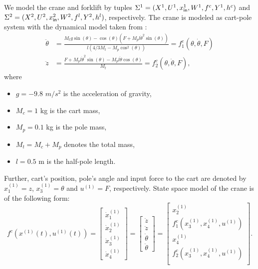 We model the crane and forklift by tuples $\Sigma^1=(X^1,U^1,x_{\mathsf{in}}^1,W^1,f^c,Y^1,h^c)$ and $\Sigma^2=(X^2,U^2,x_{\mathsf{in}}^2,W^2,f^l,Y^2,h^l)$, respectively. The crane is modeled as cart-pole system with the dynamical model taken from \cite{Barto1983}:
\begin{align*}
	\ddot{\theta} &= \frac{M_tg\sin(\theta) - \cos(\theta)(F + M_pl \dot{\theta}^2 \sin(\theta))}{l(4/3 M_t- M_p \cos^2(\theta))}=f^c_1(\theta,\dot{\theta},F)\\
	\ddot{z}&= \frac{F + M_pl \dot{\theta}^2 \sin(\theta)-M_pl \ddot{\theta} \cos(\theta)}{M_t}=f^c_2(\theta,\dot{\theta},F),
\end{align*}
where
\begin{itemize}
	\item[] $g=-9.8$ $m/s^2$ is the acceleration of gravity,
	\item[] $M_c=1$ kg is the cart mass,
	\item[] $M_p=0.1$ kg is the pole mass,
	\item[] $M_t=M_c+M_p$ denotes the total mass,
	\item[] $l=0.5$ m is the half-pole length.
\end{itemize}
Further, cart's position, pole's angle and input force to the cart are denoted by $x_1^{(1)}=z$, $x_3^{(1)}=\theta$ and $u^{(1)}=F$, respectively. State space model of the crane is of the following form:
\[f^{c}(x^{(1)}(t),u^{(1)}(t))=\begin{bmatrix}
	\dot{x}_1^{(1)}\\
	\dot{x}_2^{(1)}\\
	\dot{x}_3^{(1)}\\
	\dot{x}_4^{(1)}
\end{bmatrix}=\begin{bmatrix}
\dot{z}\\
\ddot{z}\\
\dot{\theta}\\
\ddot{\theta}
\end{bmatrix}=
\begin{bmatrix}
	x_2^{(1)}\\
	f^c_1(x_3^{(1)},x_4^{(1)},u^{(1)})\\
	x_4^{(1)}\\
	f^c_2(x_3^{(1)},x_4^{(1)},u^{(1)})\\
\end{bmatrix}.\]
